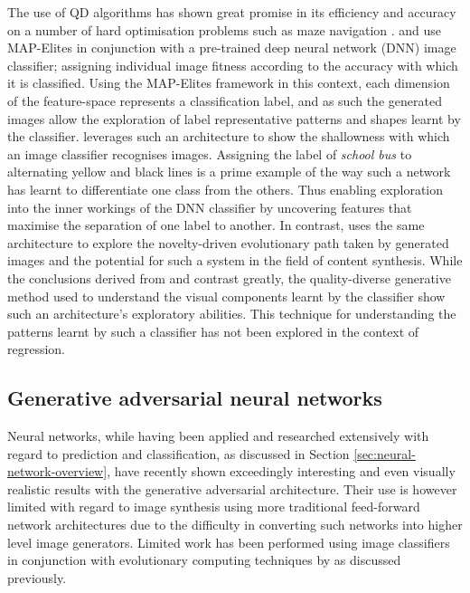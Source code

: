 \documentclass{article}
\begin{document}
The use of QD algorithms has shown great promise in its efficiency and accuracy on a number of hard optimisation problems \citep{pugh2016quality} such as maze navigation \citep{lehman2011abandoning}.
\citet{nguyen2015deep} and \citet{nguyen2015innovation} use MAP-Elites in conjunction with a pre-trained deep neural network (DNN) image classifier; assigning individual image fitness according to the accuracy with which it is classified.
Using the MAP-Elites framework in this context, each dimension of the feature-space represents a classification label, and as such the generated images allow the exploration of label representative patterns and shapes learnt by the classifier.
\citet{nguyen2015deep} leverages such an architecture to show the shallowness with which an image classifier recognises images.
Assigning the label of \textit{school bus} to alternating yellow and black lines is a prime example of the way such a network has learnt to differentiate one class from the others.
Thus enabling exploration into the inner workings of the DNN classifier by uncovering features that maximise the separation of one label to another.
In contrast, \citet{nguyen2015innovation} uses the same architecture to explore the novelty-driven evolutionary path taken by generated images and the potential for such a system in the field of content synthesis.
While the conclusions derived from \citet{nguyen2015innovation} and \citet{nguyen2015deep} contrast greatly, the quality-diverse generative method used to understand the visual components learnt by the classifier show such an architecture's exploratory abilities.
This technique for understanding the patterns learnt by such a classifier has not been explored in the context of regression.


\subsection{Generative adversarial neural networks}

Neural networks, while having been applied and researched extensively with regard to prediction and classification, as discussed in Section \ref{sec:neural-network-overview}, have recently shown exceedingly interesting and even visually realistic results with the generative adversarial architecture.
Their use is however limited with regard to image synthesis using more traditional feed-forward network architectures due to the difficulty in converting such networks into higher level image generators.
Limited work has been performed using image classifiers in conjunction with evolutionary computing techniques by \citet{nguyen2015innovation} as discussed previously.
\end{document}
